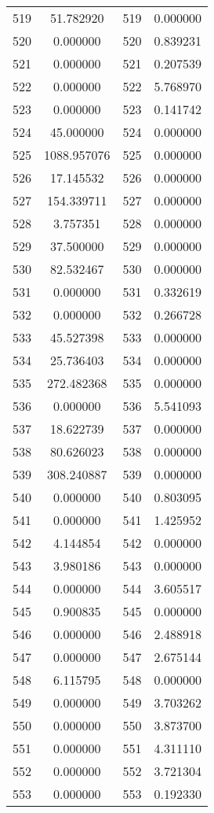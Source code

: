 \documentclass[12pt]{article}
\begin{document}
\begin{longtable}{@{}cccc@{}}
519 & 51.782920 & 519 & 0.000000 \\
520 & 0.000000 & 520 & 0.839231 \\
521 & 0.000000 & 521 & 0.207539 \\
522 & 0.000000 & 522 & 5.768970 \\
523 & 0.000000 & 523 & 0.141742 \\
524 & 45.000000 & 524 & 0.000000 \\
525 & 1088.957076 & 525 & 0.000000 \\
526 & 17.145532 & 526 & 0.000000 \\
527 & 154.339711 & 527 & 0.000000 \\
528 & 3.757351 & 528 & 0.000000 \\
529 & 37.500000 & 529 & 0.000000 \\
530 & 82.532467 & 530 & 0.000000 \\
531 & 0.000000 & 531 & 0.332619 \\
532 & 0.000000 & 532 & 0.266728 \\
533 & 45.527398 & 533 & 0.000000 \\
534 & 25.736403 & 534 & 0.000000 \\
535 & 272.482368 & 535 & 0.000000 \\
536 & 0.000000 & 536 & 5.541093 \\
537 & 18.622739 & 537 & 0.000000 \\
538 & 80.626023 & 538 & 0.000000 \\
539 & 308.240887 & 539 & 0.000000 \\
540 & 0.000000 & 540 & 0.803095 \\
541 & 0.000000 & 541 & 1.425952 \\
542 & 4.144854 & 542 & 0.000000 \\
543 & 3.980186 & 543 & 0.000000 \\
544 & 0.000000 & 544 & 3.605517 \\
545 & 0.900835 & 545 & 0.000000 \\
546 & 0.000000 & 546 & 2.488918 \\
547 & 0.000000 & 547 & 2.675144 \\
548 & 6.115795 & 548 & 0.000000 \\
549 & 0.000000 & 549 & 3.703262 \\
550 & 0.000000 & 550 & 3.873700 \\
551 & 0.000000 & 551 & 4.311110 \\
552 & 0.000000 & 552 & 3.721304 \\
553 & 0.000000 & 553 & 0.192330 \\

\end{longtable}
\end{document}
